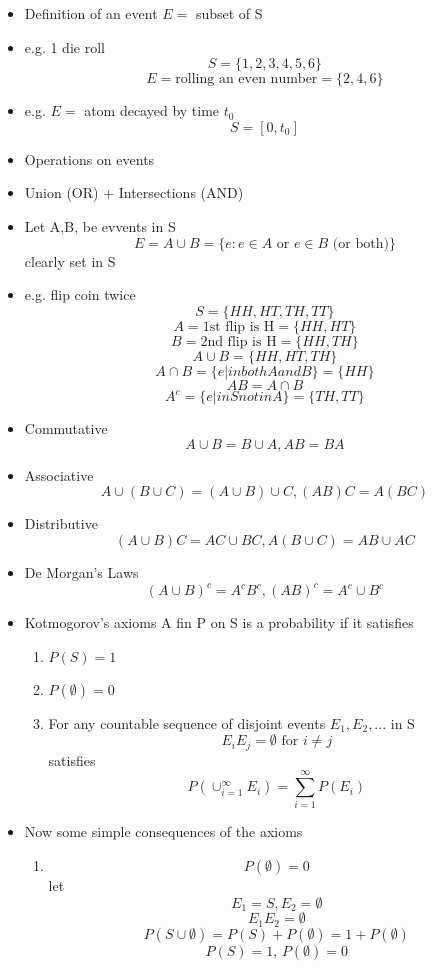 \begin{itemize}
    \item Definition of an event $E=$ subset of S
    \item e.g. 1 die roll 
    \[ S = \{1, 2, 3, 4, 5, 6\}\]
    \[ E = \text{rolling an even number} = \{2, 4, 6\}\]
    \item e.g. $E=$ atom decayed by time $t_0$
    \[ S = [0, t_0] \]
    \item Operations on events
    \item Union (OR) + Intersections (AND)
    \item Let A,B, be evvents in S
    \[ E = A \cup B = \{e: e \in A \text{ or } e \in B \text{ (or both)}\}\]
    clearly set in S
    \item e.g. flip coin twice 
    \[ S = \{HH, HT, TH, TT\}\]
    \[ A = \text{1st flip is H} = \{HH, HT\}\]
    \[ B = \text{2nd flip is H} = \{HH, TH\}\]
    \[ A \cup B = \{HH, HT, TH\}\]
    \[ A \cap B = \{ e | in both A and B\} = \{HH\}\]
    \[ A B = A \cap B\]
    \[ A^c = \{ e | in S not in A\} = \{TH, TT\}\]
    \item Commutative
    \[ A \cup B = B \cup A, A B = B A\]
    \item Associative
    \[ A \cup (B \cup C) = (A \cup B) \cup C , (AB)C = A(BC)\] 
    \item Distributive
    \[ (A\cup B)C = AC \cup BC, A(B \cup C) = AB \cup AC\]
    \item De Morgan's Laws
    \[ (A \cup B)^c = A^c B^c, (AB)^c = A^c \cup B^c\]
    \item Kotmogorov's axioms
    A fin P on S is a probability if it satisfies
    \begin{enumerate}
        \item $P(S) = 1$
        \item $P(\emptyset) = 0$
        \item For any countable sequence of disjoint events $E_1, E_2, ...$ in S
        \[ E_i E_j = \emptyset \text{ for } i \neq j\]
        satisfies
        \[ P(\cup_{i=1}^{\infty} E_i) = \sum_{i=1}^{\infty} P(E_i)\]
    \end{enumerate}
    \item Now some simple consequences of the axioms
    \begin{enumerate}
    \item \[P(\emptyset) = 0\]
    let \[E_1 = S, E_2 = \emptyset \]
    \[ E_1 E_2 = \emptyset\]
    \[ P(S\cup \emptyset) = P(S) + P(\emptyset) = 1 + P(\emptyset)\]
    \[ P(S) = 1 , \, P(\emptyset) = 0\]

\end{enumerate}
\end{itemize}
